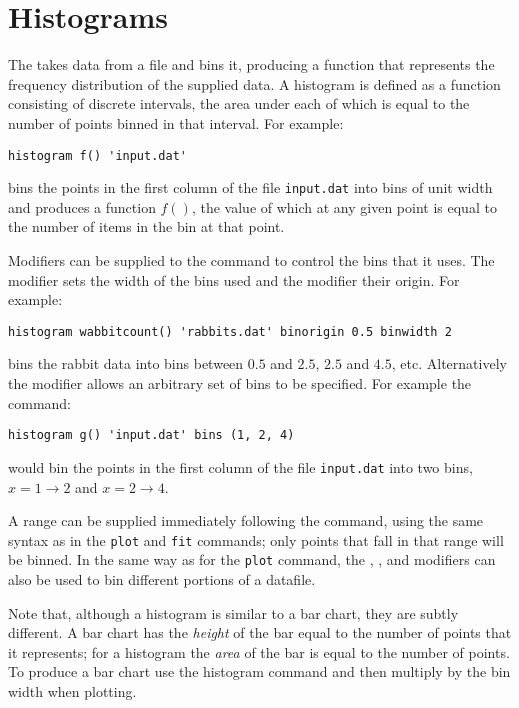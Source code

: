 \section{Histograms}

The  takes data from a file and bins it, producing a
function that represents the frequency distribution of the supplied data.  A
histogram is defined as a function consisting of discrete intervals, the area
under each of which is equal to the number of points binned in that interval.
For example:

\begin{verbatim}
histogram f() 'input.dat'
\end{verbatim}

\noindent bins the points in the first column of the file {\tt input.dat}
into bins of unit width and produces a function $f()$, the value of which at any
given point is equal to the number of items in the bin at that point.

Modifiers can be supplied to the  command to control the bins
that it uses.  The  modifier sets the width of the bins used
and the  modifier their origin.  For example:

\begin{verbatim}
histogram wabbitcount() 'rabbits.dat' binorigin 0.5 binwidth 2
\end{verbatim}

\noindent bins the rabbit data into bins between $0.5$ and $2.5$, $2.5$ and
$4.5$, etc.  Alternatively the  modifier allows an arbitrary set
of bins to be specified. For example the command:

\begin{verbatim}
histogram g() 'input.dat' bins (1, 2, 4)
\end{verbatim}

\noindent would bin the points in the first column of the file {\tt input.dat}
into two bins, $x=1\to 2$ and $x=2\to 4$.

A range can be supplied immediately following the command, using the same
syntax as in the {\tt plot} and {\tt fit} commands; only points that fall in
that range will be binned.  In the same way as for the {\tt plot} command,
the , ,  and 
modifiers can also be used to bin different portions of a datafile.

Note that, although a histogram is similar to a bar chart, they are subtly
different.  A bar chart has the {\it height} of the bar equal to the number of
points that it represents; for a histogram the {\it area} of the bar is equal to
the number of points.  To produce a bar chart use the histogram
command and then multiply by the bin width when plotting.

